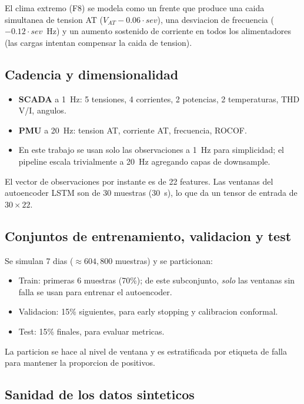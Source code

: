 El clima extremo (F8) se modela como un frente que produce una
caida simultanea de tension AT ($V_{AT} - 0.06 \cdot sev$), una
desviacion de frecuencia ($-0.12 \cdot sev$~Hz) y un aumento
sostenido de corriente en todos los alimentadores (las cargas
intentan compensar la caida de tension).

\subsection{Cadencia y dimensionalidad}

\begin{itemize}[leftmargin=*,itemsep=2pt]
  \item \textbf{SCADA} a 1~Hz: 5 tensiones, 4 corrientes, 2 potencias,
        2 temperaturas, THD V/I, angulos.
  \item \textbf{PMU} a 20~Hz: tension AT, corriente AT, frecuencia,
        ROCOF.
  \item En este trabajo se usan solo las observaciones a 1~Hz para
        simplicidad; el pipeline escala trivialmente a 20~Hz agregando
        capas de downsample.
\end{itemize}

El vector de observaciones por instante es de 22 features. Las
ventanas del autoencoder LSTM son de 30 muestras (30~s), lo que da
un tensor de entrada de $30 \times 22$.

\subsection{Conjuntos de entrenamiento, validacion y test}

Se simulan 7 dias ($\approx 604{,}800$ muestras) y se particionan:

\begin{itemize}[leftmargin=*,itemsep=2pt]
  \item Train: primeras 6 muestras (70\%); de este subconjunto,
        \emph{solo} las ventanas sin falla se usan para entrenar el
        autoencoder.
  \item Validacion: 15\% siguientes, para early stopping y calibracion
        conformal.
  \item Test: 15\% finales, para evaluar metricas.
\end{itemize}

La particion se hace al nivel de ventana y es estratificada por
etiqueta de falla para mantener la proporcion de positivos.

\subsection{Sanidad de los datos sinteticos}

